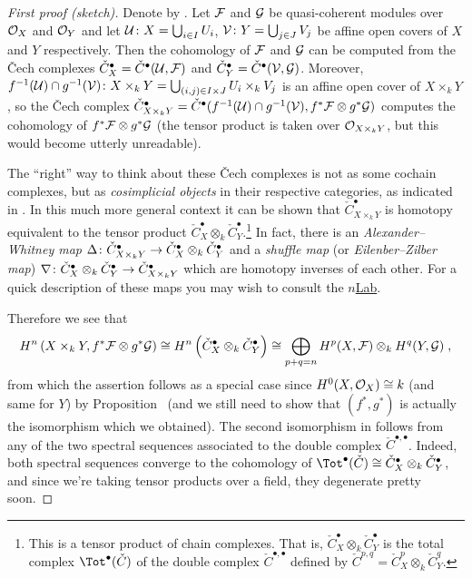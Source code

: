\documentclass[a4paper,parskip=half,numbers=enddot, DIV=12]{scrreprt}
\begin{document}
\begin{proof}[First proof (sketch)]
	Denote by . Let $\mathcal{F}$ and $\mathcal{G}$ be quasi-coherent modules over $\mathcal{O}_X$ and $\mathcal{O}_Y$ and let $\mathcal{U}\colon X=\bigcup_{i\in I}U_i$, $\mathcal{V}\colon Y=\bigcup_{j\in J}V_j$ be affine open covers of $X$ and $Y$ respectively. Then the cohomology of $\mathcal{F}$ and $\mathcal{G}$ can be computed from the \v Cech complexes $\check{C}_X^\bullet=\check{C}^\bullet(\mathcal{U},\mathcal{F})$ and $\check{C}_Y^\bullet=\check{C}^\bullet(\mathcal{V},\mathcal{G})$. Moreover, $f^{-1}(\mathcal{U})\cap g^{-1}(\mathcal{V})\colon X\times_kY=\bigcup_{(i,j)\in I\times J}U_i\times_kV_j$ is an affine open cover of $X\times_kY$, so the \v Cech complex $\check{C}_{X\times_kY}^\bullet=\check{C}^\bullet(f^{-1}(\mathcal{U})\cap g^{-1}(\mathcal{V}),f^*\mathcal{F}\otimes g^*\mathcal{G})$ computes the cohomology of $f^*\mathcal{F}\otimes g^*\mathcal{G}$ (the tensor product is taken over $\mathcal{O}_{X\times_kY}$, but this would become utterly unreadable).
	
	The ``right'' way to think about these \v Cech complexes is not as some cochain complexes, but as \emph{cosimplicial objects} in their respective categories, as indicated in \cite[Remark~1.2.1]{alggeo2}. In this much more general context it can be shown that $\check{C}_{X\times_kY}^\bullet$ is homotopy equivalent to the tensor product $\check{C}_X^\bullet\otimes_k\check{C}_Y^\bullet$.\footnote{This is a tensor product of chain complexes. That is, $\check{C}_X^\bullet\otimes_k\check{C}_Y^\bullet$ is the total complex $\Tot^\bullet(\check{C})$ of the double complex $\check{C}^{\bullet,\bullet}$ defined by $\check{C}^{p,q}=\check{C}_X^p\otimes_k\check{C}_Y^q$.} In fact, there is an \emph{Alexander--Whitney map} $\Delta\colon \check{C}_{X\times_kY}^\bullet\morphism\check{C}_X^\bullet\otimes_k\check{C}_Y^\bullet$ and a \emph{shuffle map} (or \emph{Eilenber--Zilber map}) $\nabla\colon\check{C}_X^\bullet\otimes_k\check{C}_Y^\bullet\morphism\check{C}_{X\times_kY}^\bullet$ which are homotopy inverses of each other. For a quick description of these maps you may wish to consult the \href{https://ncatlab.org/nlab/show/Alexander-Whitney+map}{$n$Lab}.
	
	Therefore we see that
	\begin{align}\lbl{eq:Künneth}
		H^n\left(X\times_kY,f^*\Ff\otimes g^*\Gg\right)\cong H^n\left(\check{C}_X^\bullet\otimes_k\check{C}_Y^\bullet\right)\cong \bigoplus_{p+q=n}H^p(X,\Ff)\otimes_kH^q(Y,\Gg)\;,
	\end{align}
	from which the assertion follows as a special case since $H^0(X,\mathcal{O}_X)\cong k$ (and same for $Y$) by Proposition~ (and we still need to show that $(f^*,g^*)$ is actually the isomorphism which we obtained). The second isomorphism in  follows from any of the two spectral sequences associated to the double complex $\check{C}^{\bullet,\bullet}$. Indeed, both spectral sequences converge to the cohomology of $\Tot^\bullet(\check{C})\cong \check{C}_X^\bullet\otimes_k\check{C}_Y^\bullet$, and since we're taking tensor products over a field, they degenerate pretty soon.
\end{proof}
\end{document}
